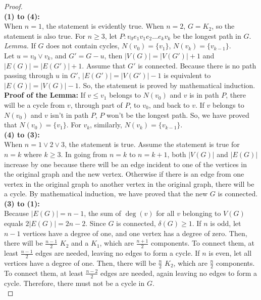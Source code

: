 \documentclass[a4paper,12pt]{report}
\begin{document}
\begin{proof}\mbox{}\\
\textbf{(1) to (4):} \\
When $n = 1$, the statement is evidently true. When $n = 2$, $G = K_2$, so the statement is also true. For $n \geq 3$, let \(P: v_0e_1v_1e_2\ldots e_kv_k\) be the longest path in $G$. \\
\textit{Lemma. }If $G$ does not contain cycles, \(N(v_0) = \{v_1\}\), \(N(v_k) = \{v_{k-1}\}\). \\
Let \(u = v_0\vee v_k\), and \(G' = G - u\), then \(|V(G)| = |V(G')| + 1\) and \(|E(G)| = |E(G')| + 1\). Assume that \(G'\) is connected. Because there is no path passing through \(u\) in $G'$, \(|E(G')| = |V(G')| - 1\) is equivalent to \(|E(G)| = |V(G)| - 1\). So, the statement is proved by mathematical induction. \\
\textbf{Proof of the Lemma:} If \(v\leq v_1\) belongs to \(N(v_0)\) and \(v\) is in path \(P\), there will be a cycle from \(v\), through part of \(P\), to \(v_0\), and back to \(v\). If \(v\) belongs to \(N(v_0)\) and \(v\) isn't in path \(P\), \(P\) won't be the longest path. So, we have proved that \(N(v_0) = \{v_1\}\). For \(v_k\), similarly,  \(N(v_k) = \{v_{k-1}\}\). \\
\textbf{(4) to (3):} \\
When $n = 1\vee 2\vee 3$, the statement is true. Assume the statement is true for \(n = k\) where \(k \geq 3\). In going from \(n = k\) to \(n = k+1\), both \(|V(G)|\) and \(|E(G)|\) increase by one because there will be an edge incident to one of the vertices in the original graph and the new vertex. Otherwise if there is an edge from one vertex in the original graph to another vertex in the original graph, there will be a cycle. By mathematical induction, we have proved that the new $G$ is connected. \\
\textbf{(3) to (1):} \\
Because \(|E(G)| = n - 1\), the sum of \(\deg(v)\) for all \(v\) belonging to \(V(G)\) equals \(2|E(G)| = 2n - 2\). Since \(G\) is connected, \(\delta(G) \geq 1\). If \(n\) is odd, let \(n-1\) vertices have a degree of one, and one vertex has a degree of zero. Then, there will be \(\frac{n-1}{2}\) \(K_2\) and a \(K_1\), which are \(\frac{n+1}{2}\) components. To connect them, at least \(\frac{n-1}{2}\) edges are needed, leaving no edges to form a cycle. If \(n\) is even, let all vertices have a degree of one. Then, there will be \(\frac{n}{2}\) \(K_2\), which are \(\frac{n}{2}\) components. To connect them, at least \(\frac{n-2}{2}\) edges are needed, again leaving no edges to form a cycle. Therefore, there must not be a cycle in $G$. \\

\end{proof}
\end{document}
